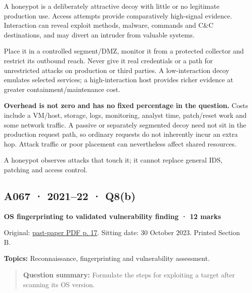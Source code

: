\documentclass[11pt,a4paper]{article}
\begin{document}
A honeypot is a deliberately attractive decoy with little or no legitimate production use. Access attempts provide comparatively high-signal evidence. Interaction can reveal exploit methods,\allowbreak{} malware,\allowbreak{} commands and C\&C destinations,\allowbreak{} and may divert an intruder from valuable systems.


Place it in a controlled segment/\allowbreak{}DMZ,\allowbreak{} monitor it from a protected collector and restrict its outbound reach. Never give it real credentials or a path for unrestricted attacks on production or third parties. A low-interaction decoy emulates selected services; a high-interaction host provides richer evidence at greater containment/\allowbreak{}maintenance cost.


\textbf{Overhead is not zero and has no fixed percentage in the question.} Costs include a VM/\allowbreak{}host,\allowbreak{} storage,\allowbreak{} logs,\allowbreak{} monitoring,\allowbreak{} analyst time,\allowbreak{} patch/\allowbreak{}reset work and some network traffic. A passive or separately segmented decoy need not sit in the production request path,\allowbreak{} so ordinary requests do not inherently incur an extra hop. Attack traffic or poor placement can nevertheless affect shared resources.


A honeypot observes attacks that touch it; it cannot replace general IDS,\allowbreak{} patching and access control.




\clearpage
\subsection{A067 · 2021–22 · Q8(b)}\label{a067}

\textbf{OS fingerprinting to validated vulnerability finding · 12 marks}


Original: \href{../../CSE405-Security_Merged.pdf\#page=17}{past-paper PDF p. 17}. Sitting date: 30 October 2023. Printed Section B.


\textbf{Topics:} Reconnaissance,\allowbreak{} fingerprinting and vulnerability assessment.



\begin{quote}\small

\textbf{Question summary:} Formulate the steps for exploiting a target after scanning its OS version.



\end{quote}
\end{document}
